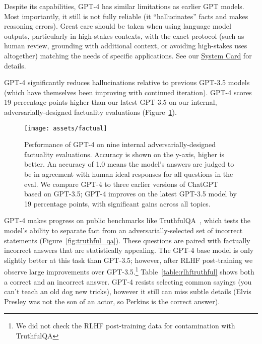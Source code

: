 \documentclass{article}
\begin{document}
Despite its capabilities, GPT-4 has similar limitations as earlier GPT models. Most importantly, it still is not fully reliable (it “hallucinates” facts and makes reasoning errors). Great care should be taken when using language model outputs, particularly in high-stakes contexts, with the exact protocol (such as human review, grounding with additional context, or avoiding high-stakes uses altogether) matching the needs of specific applications. See our \hyperref[systemcard]{System Card} for details.

GPT-4 significantly reduces hallucinations relative to previous GPT-3.5 models (which have themselves been improving with continued iteration). GPT-4 scores 19 percentage points higher than our latest GPT-3.5 on our internal, adversarially-designed factuality evaluations (Figure~\ref{fig:factual}).


\begin{figure}[htbp]
    \centering
    \texttt{[image: assets/factual]}
    \caption{Performance of GPT-4 on nine internal adversarially-designed factuality evaluations. Accuracy is shown on the y-axis, higher is better. An accuracy of 1.0 means the model’s answers are judged to be in agreement with human ideal responses for all questions in the eval. We compare GPT-4 to three earlier versions of ChatGPT~\cite{openaichatgptblog} based on GPT-3.5; GPT-4 improves on the latest GPT-3.5 model by 19 percentage points, with significant gains across all topics.}
    \label{fig:factual}
\end{figure}

GPT-4 makes progress on public benchmarks like TruthfulQA~\cite{lin-etal-2022-truthfulqa}, which tests the model’s ability to separate fact from an adversarially-selected set of incorrect statements (Figure~\ref{fig:truthful_qa}). These questions are paired with factually incorrect answers that are statistically appealing. The GPT-4 base model is only slightly better at this task than GPT-3.5; however, after RLHF post-training we observe large improvements over GPT-3.5.\footnote{We did not check the RLHF post-training data for contamination with TruthfulQA} Table~\ref{table:rlhftruthful} shows both a correct and an incorrect answer. GPT-4 resists selecting common sayings (you can’t teach an old dog new tricks), however it still can miss subtle details (Elvis Presley was not the son of an actor, so Perkins is the correct answer).
\end{document}
